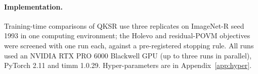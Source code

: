 \paragraph{Implementation.}
Training-time comparisons of QKSR use three replicates on ImageNet-R seed 1993
in one computing environment; the Holevo and residual-POVM objectives were
screened with one run each, against a pre-registered stopping rule. All runs
used an NVIDIA RTX PRO 6000 Blackwell GPU (up to three runs in parallel),
PyTorch 2.11 and timm 1.0.29.
Hyper-parameters are in Appendix~\ref{app:hyper}.
